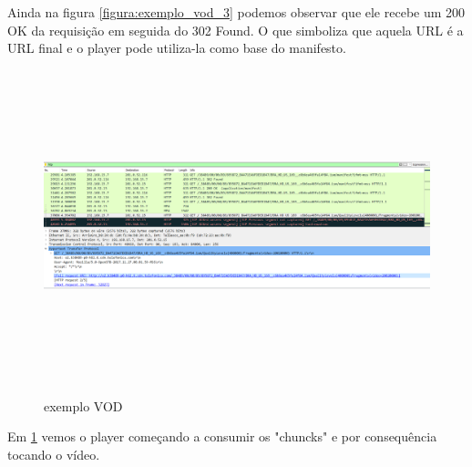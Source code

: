 Ainda na figura \ref{figura:exemplo_vod_3} podemos observar que ele recebe um 200 OK da requisi\c{c}\~ao em seguida do 302 Found. O que simboliza que aquela URL \'e a URL final e o player pode utiliza-la como base do manifesto. 

\begin{figure}[H]
\caption{exemplo VOD}
\includegraphics[height=9cm]{Figuras/exemplo_vod_4.png}
\label{figura:exemplo_vod_4}
\end{figure}

Em \ref{figura:exemplo_vod_4} vemos o player come\c{c}ando a consumir os "chuncks" e por consequ\^encia tocando o v\'ideo.